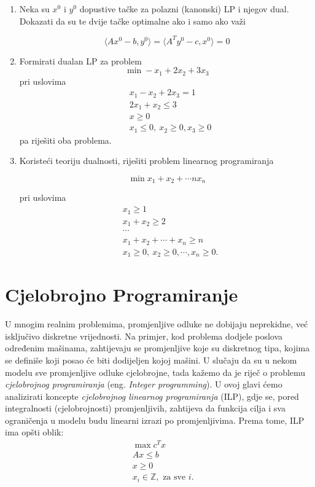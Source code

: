 \documentclass[a4paper, utf8, 11pt, colorlinks]{book}
\theoremstyle{definition}
\begin{document}
\begin{enumerate}
\item Neka su $x^0$ i $y^0$ dopustive tačke za polazni (kanonski) LP i njegov dual. Dokazati da su te dvije tačke optimalne ako i samo ako važi 

$$\langle Ax^0-b,y^0\rangle=\langle A^Ty^0-c,x^0\rangle=0$$

\item Formirati dualan LP za problem
$$\min -x_1+2x_2+3x_3$$
pri uslovima
\begin{align}
	& x_1-x_2+2x_3=1\nonumber\\
	& 2x_1+x_2\leqslant 3\nonumber \\
	& x \geq 0\nonumber \\
	& x_1\leqslant 0,\ x_2\geqslant 0, x_3\geqslant 0 \nonumber
\end{align}
pa riješiti oba problema.

\item Koristeći teoriju dualnosti, riješiti problem linearnog programiranja

$$\min x_1+x_2+\cdots nx_n$$

pri uslovima
$$
\begin{aligned}
	& x_1\geqslant 1\\
	& x_1+x_2\geqslant 2 \\
	& \cdots\\
	& x_1+x_2+\cdots+x_n\geqslant n\\
	&x_1\geqslant 0,\ x_2\geqslant 0,\cdots,x_n\geqslant 0.
\end{aligned}$$
\end{enumerate}
\chapter{Cjelobrojno Programiranje}\label{chp:ilp}

U mnogim realnim problemima, promjenljive odluke ne dobijaju neprekidne, već isključivo diskretne vrijednosti. Na primjer, kod problema dodjele poslova određenim mašinama, zahtijevaju se promjenljive koje su diskretnog tipa, kojima se definiše koji posao će biti dodijeljen kojoj mašini. U slučaju da su u nekom modelu sve promjenljive odluke cjelobrojne, tada kažemo da je riječ o problemu \emph{cjelobrojnog programiranja} (eng. \emph{Integer programming}). 
U ovoj glavi ćemo analizirati koncepte   \emph{cjelobrojnog linearnog programiranja} (ILP), gdje se, pored integralnosti (cjelobrojnosti) promjenljivih, zahtijeva da funkcija cilja  i sva ograničenja u modelu budu linearni izrazi po promjenljivima. Prema tome, ILP ima opšti oblik:
\begin{align}
    & \max c^T x \nonumber\\
    & A x \leq b \nonumber \\
    & x \geq 0 \nonumber\\
    & x_i \in \mathbb{Z}, \mbox{ za sve } i. \label{ilp-formulation}
\end{align}
\end{document}
